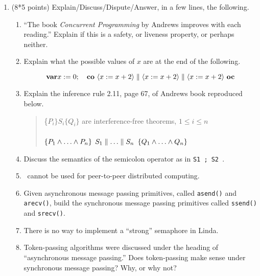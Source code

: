 \begin{enumerate}

\item (8*5 points)
Explain/Discuss/Dispute/Answer, in a few lines, the following.


\begin{enumerate}
\item ``The book {\sl Concurrent Programming} by Andrews improves
with each reading.''  Explain if this is a safety, or liveness
property, or perhaps neither.

\item
Explain what the possible values of $x$ are at the end of the following.

\[{\bf var}  x := 0;\quad
{\bf co}\ \langle x := x + 2 \rangle
\parallel \langle x := x + 2 \rangle
\parallel\langle x := x + 2 \rangle \ {\bf oc}\]


\item
Explain the inference rule 2.11, page 67, of Andrews book reproduced
below.
\begin{quote}
\begin{centering}
\{$P_i\} S_i \{Q_i\}$ are interference-free theorems, $1 \leq i \leq
n$\\[-8pt]
~\hrulefill\\[-4pt]
$\{P_1 \wedge \ldots \wedge P_n\}$
\co\quad $S_1 \parallel \ldots \parallel S_n$ \quad\oc
$\{Q_1 \wedge \ldots \wedge Q_n\}$\par
\end{centering}
\end{quote}

\item Discuss the semantics of the semicolon operator as in {\tt S1 ;
S2 }.

\item
\RPC\ cannot be used for peer-to-peer distributed computing.


\item
Given asynchronous message passing primitives, called {\tt asend()}
and {\tt arecv()}, build the synchronous message passing primitives
called {\tt ssend()} and {\tt srecv()}.


\item
There is no way to implement a ``strong'' semaphore in Linda.

\item Token-passing algorithms were discussed under the heading 
of ``asynchronous message passing.''  Does token-passing make sense
under synchronous message passing?  Why, or why not?


\end{enumerate}


\end{enumerate}
